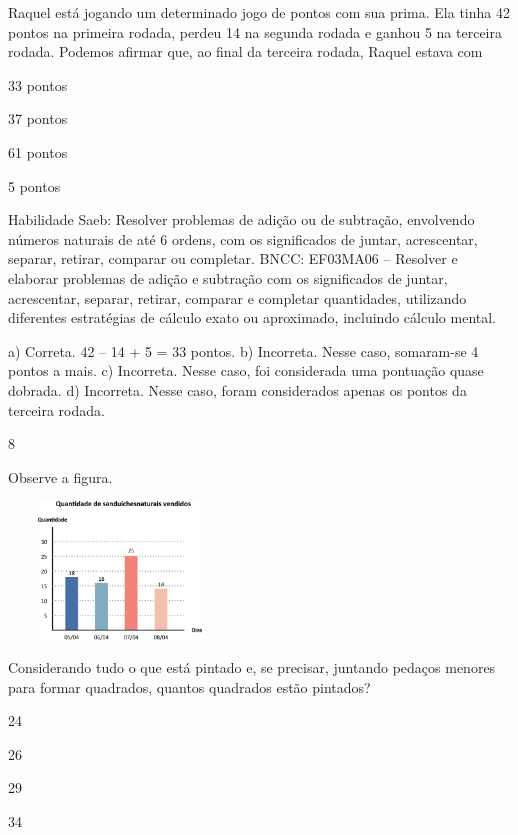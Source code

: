 {\begin{escolha}
{Raquel está jogando um determinado jogo de pontos com sua prima. Ela
tinha 42 pontos na primeira rodada, perdeu 14 na segunda rodada e ganhou
5 na terceira rodada. Podemos afirmar que, ao final da terceira rodada, Raquel estava com

\begin{escolha}
\item
  33 pontos
\item
  37 pontos
\item
  61 pontos
\item
  5 pontos
\end{escolha}

Habilidade Saeb: Resolver problemas de adição ou de subtração,
envolvendo números naturais de até 6 ordens, com os significados de
juntar, acrescentar, separar, retirar, comparar ou completar.
BNCC: EF03MA06 – Resolver e elaborar problemas de adição e subtração com os significados de
juntar, acrescentar, separar, retirar, comparar e completar quantidades, utilizando diferentes
estratégias de cálculo exato ou aproximado, incluindo cálculo mental.


a) Correta. 42 -- 14 + 5 = 33 pontos.
b) Incorreta. Nesse caso, somaram-se 4 pontos a mais.
c) Incorreta. Nesse caso, foi considerada uma pontuação quase dobrada.
d) Incorreta. Nesse caso, foram considerados apenas os pontos da terceira rodada.

\num{8}

Observe a figura.


\includegraphics[width=2.32692in,height=1.43990in]{media/image109.png}

Considerando tudo o que está pintado e, se precisar, juntando pedaços
menores para formar quadrados, quantos quadrados estão pintados?

\begin{escolha}
\item
  24
\item
  26
\item
  29
\item
  34
\end{escolha}


}
\end{escolha}}
